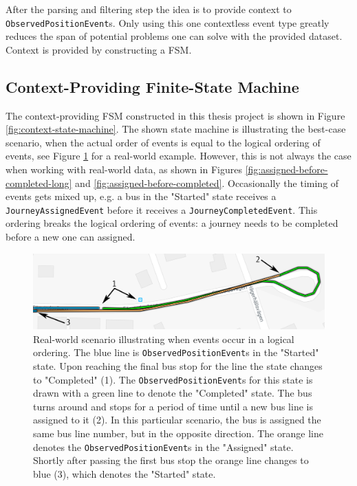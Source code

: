 After the parsing and filtering step the idea is to provide context to \texttt{ObservedPositionEvent}s.
Only using this one contextless event type greatly reduces the span of potential problems one can solve with the provided dataset.
Context is provided by constructing a FSM.

\subsection{Context-Providing Finite-State Machine}
The context-providing FSM constructed in this thesis project is shown in Figure \ref{fig:context-state-machine}.
The shown state machine is illustrating the best-case scenario, when the actual order of events is equal to the logical ordering of events, see Figure \ref{fig:assigned-before-completed-working} for a real-world example.
However, this is not always the case when working with real-world data, as shown in Figures \ref{fig:assigned-before-completed-long} and \ref{fig:assigned-before-completed}.
Occasionally the timing of events gets mixed up, e.g. a bus in the "Started" state receives a \texttt{JourneyAssignedEvent} before it receives a \texttt{JourneyCompletedEvent}.
This ordering breaks the logical ordering of events: a journey needs to be completed before a new one can assigned.

\begin{figure}[t]
    \centering
    \includegraphics[width=1\textwidth]{figures/assigned_completed_working}
    \caption[Real-world scenario illustrating when events occur in a logical ordering]
    {\small Real-world scenario illustrating when events occur in a logical ordering.
    The blue line is \texttt{ObservedPositionEvent}s in the "Started" state.
    Upon reaching the final bus stop for the line the state changes to "Completed" (1).
    The \texttt{ObservedPositionEvent}s for this state is drawn with a green line to denote the "Completed" state.
    The bus turns around and stops for a period of time until a new bus line is assigned to it (2).
    In this particular scenario, the bus is assigned the same bus line number, but in the opposite direction.
    The orange line denotes the \texttt{ObservedPositionEvent}s in the "Assigned" state.
    Shortly after passing the first bus stop the orange line changes to blue (3), which denotes the "Started" state.}
    \label{fig:assigned-before-completed-working}
\end{figure}

